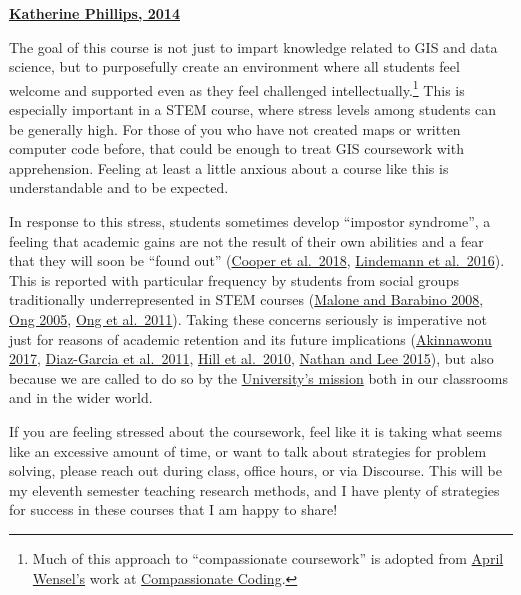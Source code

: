 \documentclass[
]{book}
\begin{document}
\textbf{\href{https://www.scientificamerican.com/article/how-diversity-makes-us-smarter/}{Katherine Phillips, 2014}}

The goal of this course is not just to impart knowledge related to GIS and data science, but to purposefully create an environment where all students feel welcome and supported even as they feel challenged intellectually.\footnote{Much of this approach to ``compassionate coursework'' is adopted from \href{https://twitter.com/aprilwensel}{April Wensel's} work at \href{https://compassionatecoding.com}{Compassionate Coding}.} This is especially important in a STEM course, where stress levels among students can be generally high. For those of you who have not created maps or written computer code before, that could be enough to treat GIS coursework with apprehension. Feeling at least a little anxious about a course like this is understandable and to be expected.

In response to this stress, students sometimes develop ``impostor syndrome'', a feeling that academic gains are not the result of their own abilities and a fear that they will soon be ``found out'' (\href{https://www.physiology.org/doi/10.1152/advan.00085.2017}{Cooper et al.~2018}, \href{http://genderandset.open.ac.uk/index.php/genderandset/article/view/435}{Lindemann et al.~2016}). This is reported with particular frequency by students from social groups traditionally underrepresented in STEM courses (\href{https://onlinelibrary.wiley.com/doi/pdf/10.1002/sce.20307}{Malone and Barabino 2008}, \href{https://doi.org/10.1525/sp.2005.52.4.593}{Ong 2005}, \href{https://doi.org/10.17763/haer.81.2.t022245n7x4752v2}{Ong et al.~2011}). Taking these concerns seriously is imperative not just for reasons of academic retention and its future implications (\href{https://open.nytimes.com/why-having-a-diverse-team-will-make-your-products-better-c73e7518f677}{Akinnawonu 2017}, \href{https://www.tandfonline.com/doi/abs/10.5172/impp.2013.15.2.149}{Diaz-Garcia et al.~2011}, \href{https://www.aauw.org/aauw_check/pdf_download/show_pdf.php?file=why-so-few-research}{Hill et al.~2010}, \href{https://www.tandfonline.com/doi/abs/10.1111/ecge.12016}{Nathan and Lee 2015}), but also because we are called to do so by the \href{https://www.slu.edu/about/catholic-jesuit-identity/mission.php}{University's mission} both in our classrooms and in the wider world.

If you are feeling stressed about the coursework, feel like it is taking what seems like an excessive amount of time, or want to talk about strategies for problem solving, please reach out during class, office hours, or via Discourse. This will be my eleventh semester teaching research methods, and I have plenty of strategies for success in these courses that I am happy to share!
\end{document}
